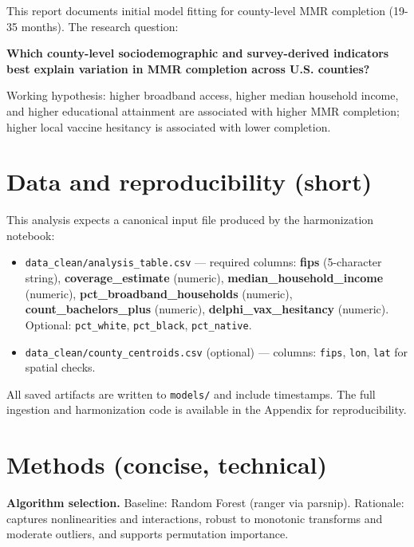 \documentclass[
  11pt,
]{article}
\providecommand{\tightlist}{%
  \setlength{\itemsep}{0pt}\setlength{\parskip}{0pt}}
\begin{document}
This report documents initial model fitting for county-level MMR
completion (19-35 months). The research question:

\textbf{Which county-level sociodemographic and survey-derived
indicators best explain variation in MMR completion across U.S.
counties?}

Working hypothesis: higher broadband access, higher median household
income, and higher educational attainment are associated with higher MMR
completion; higher local vaccine hesitancy is associated with lower
completion.

\newpage

\section{Data and reproducibility
(short)}\label{data-and-reproducibility-short}

This analysis expects a canonical input file produced by the
harmonization notebook:

\begin{itemize}
\tightlist
\item
  \texttt{data\_clean/analysis\_table.csv} --- required columns:
  \textbf{fips} (5-character string), \textbf{coverage\_estimate}
  (numeric), \textbf{median\_household\_income} (numeric),
  \textbf{pct\_broadband\_households} (numeric),
  \textbf{count\_bachelors\_plus} (numeric),
  \textbf{delphi\_vax\_hesitancy} (numeric). Optional:
  \texttt{pct\_white}, \texttt{pct\_black}, \texttt{pct\_native}.\\
\item
  \texttt{data\_clean/county\_centroids.csv} (optional) --- columns:
  \texttt{fips}, \texttt{lon}, \texttt{lat} for spatial checks.
\end{itemize}

All saved artifacts are written to \texttt{models/} and include
timestamps. The full ingestion and harmonization code is available in
the Appendix for reproducibility.

\newpage

\section{Methods (concise, technical)}\label{methods-concise-technical}

\textbf{Algorithm selection.} Baseline: Random Forest (ranger via
parsnip). Rationale: captures nonlinearities and interactions, robust to
monotonic transforms and moderate outliers, and supports permutation
importance.
\end{document}
